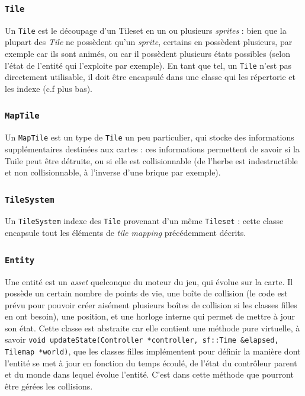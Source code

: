 \documentclass[a4paper,10pt]{report}
\begin{document}
\subsubsection{\texttt{Tile}}

Un \texttt{Tile} est le découpage d'un Tileset en un ou plusieurs \textit{sprites} : bien que la plupart des \textit{Tile} ne possèdent qu'un \textit{sprite}, certains en possèdent plusieurs, par exemple car ils sont animés, ou car il possèdent plusieurs états possibles (selon l'état de l'entité qui l'exploite par exemple). En tant que tel, un \texttt{Tile} n'est pas directement utilisable, il doit être encapsulé dans une classe qui les répertorie et les indexe (c.f plus bas).
\subsubsection{\texttt{MapTile}}

Un \texttt{MapTile} est un type de \texttt{Tile} un peu particulier, qui stocke des informations supplémentaires destinées aux cartes : ces informations permettent de savoir si la Tuile peut être détruite, ou si elle est collisionnable (de l'herbe est indestructible et non collisionnable, à l'inverse d'une brique par exemple).
\subsubsection{\texttt{TileSystem}}

Un \texttt{TileSystem} indexe des \texttt{Tile} provenant d'un même \texttt{Tileset} : cette classe encapsule tout les éléments de \textit{tile mapping} précédemment décrits.
\subsubsection{\texttt{Entity}}

Une entité est un \textit{asset} quelconque du moteur du jeu, qui évolue sur la carte. Il possède un certain nombre de points de vie, une boîte de collision (le code est prévu pour pouvoir créer aisément plusieurs boîtes de collision si les classes filles en ont besoin), une position, et une horloge interne qui permet de mettre à jour son état. Cette classe est abstraite car elle contient une méthode pure virtuelle, à savoir \texttt{void updateState(Controller *controller, sf::Time \&elapsed, Tilemap *world)}, que les classes filles implémentent pour définir la manière dont l'entité se met à jour en fonction du temps écoulé, de l'état du contrôleur parent et du monde dans lequel évolue l'entité. C'est dans cette méthode que pourront être gérées les collisions.
\end{document}
